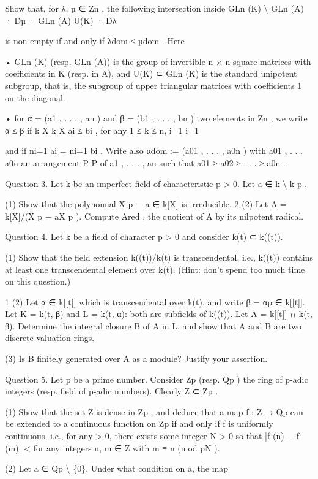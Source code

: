 \documentclass[UTF8,12pt]{ctexart}
\begin{document}
Show that, for λ, µ ∈ Zn , the following intersection inside GLn (K) \textbackslash{} GLn (A) · Dµ · GLn (A) U(K) · Dλ

is non-empty if and only if λdom ≤ µdom . Here

• GLn (K) (resp. GLn (A)) is the group of invertible n × n square matrices with coefficients in K (resp. in A), and U(K) ⊂ GLn (K) is the standard unipotent subgroup, that is, the subgroup of upper triangular matrices with coefficients 1 on the diagonal.

• for α = (a1 , . . . , an ) and β = (b1 , . . . , bn ) two elements in Zn , we write α ≤ β if k X k X ai ≤ bi , for any 1 ≤ k ≤ n, i=1 i=1

and if ni=1 ai = ni=1 bi . Write also αdom := (a01 , . . . , a0n ) with a01 , . . . a0n an arrangement P P of a1 , . . . , an such that a01 ≥ a02 ≥ . . . ≥ a0n .

Question 3. Let k be an imperfect field of characteristic p > 0. Let a ∈ k \textbackslash{} k p .

(1) Show that the polynomial X p − a ∈ k[X] is irreducible. 2 (2) Let A = k[X]/(X p − aX p ). Compute Ared , the quotient of A by its nilpotent radical.

Question 4. Let k be a field of character p > 0 and consider k(t) ⊂ k((t)).

(1) Show that the field extension k((t))/k(t) is transcendental, i.e., k((t)) contains at least one transcendental element over k(t). (Hint: don’t spend too much time on this question.)

1 (2) Let α ∈ k[[t]] which is transcendental over k(t), and write β = αp ∈ k[[t]]. Let K = k(t, β) and L = k(t, α): both are subfields of k((t)). Let A = k[[t]] ∩ k(t, β). Determine the integral closure B of A in L, and show that A and B are two discrete valuation rings.

(3) Is B finitely generated over A as a module? Justify your assertion.

Question 5. Let p be a prime number. Consider Zp (resp. Qp ) the ring of p-adic integers (resp. field of p-adic numbers). Clearly Z ⊂ Zp .

(1) Show that the set Z is dense in Zp , and deduce that a map f : Z → Qp can be extended to a continuous function on Zp if and only if f is uniformly continuous, i.e., for any > 0, there exists some integer N > 0 so that |f (n) − f (m)| < for any integers n, m ∈ Z with m ≡ n (mod pN ).

(2) Let a ∈ Qp \textbackslash{} \{0\}. Under what condition on a, the map
\end{document}
